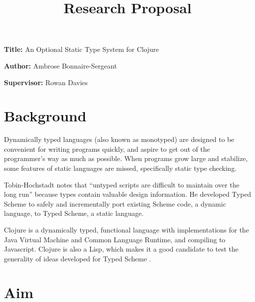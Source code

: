 \documentclass[12pt, a4paper]{article}
\title{Research Proposal}
\author{}
\date{}
\newcommand{\namelistlabel}[1]{\mbox{#1}\hfil}
\newenvironment{namelist}[1]{%
\begin{list}{}
    {
        \let\makelabel\namelistlabel
        \settowidth{\labelwidth}{#1}
        \setlength{\leftmargin}{1.1\labelwidth}
    }
  }{%
\end{list}}
\begin{document}
\maketitle

\begin{namelist}{xxxxxxxxxxxx}
\item[{\bf Title:}]
	An Optional Static Type System for Clojure
\item[{\bf Author:}]
	Ambrose Bonnaire-Sergeant
\item[{\bf Supervisor:}]
	Rowan Davies
\end{namelist}

\section*{Background} 


Dynamically typed languages (also known as monotyped) are designed to be convenient for
writing programs quickly, and aspire to get out of the programmer's
way as much as possible. When programs grow large and stabilize,
some features of static languages are missed, specifically static
type checking. 

Tobin-Hochstadt notes that ``untyped scripts are difficult to 
maintain over the long run'' \cite{TypedScheme:2010} because types
contain valuable design information.
He developed Typed Scheme
\cite{TypedScheme:2010} 
to safely and incrementally port existing Scheme code, a dynamic language, to
Typed Scheme, a static language.

Clojure is a dynamically typed, functional language with implementations for the Java Virtual
Machine and Common Language Runtime, and compiling to Javascript. Clojure
is also a Lisp, which makes it a good candidate to test the generality of
ideas developed for Typed Scheme \cite{TypedScheme:2010}.

\section*{Aim} 

\end{document}
